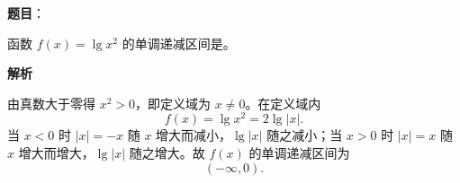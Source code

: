 \begin{answer}

\textbf{题目}：

函数 $f(x)=\lg x^2$ 的单调递减区间是\gkblank{}。

\textbf{解析}

由真数大于零得 $x^2>0$，即定义域为 $x\neq 0$。在定义域内
\nopagebreak[4]
\[f(x)=\lg x^2=2\lg|x|.\]
当 $x<0$ 时 $|x|=-x$ 随 $x$ 增大而减小，$\lg|x|$ 随之减小；当 $x>0$ 时 $|x|=x$ 随 $x$ 增大而增大，$\lg|x|$ 随之增大。故 $f(x)$ 的单调递减区间为
\nopagebreak[4]
\[(-\infty,0).\]


\end{answer}
